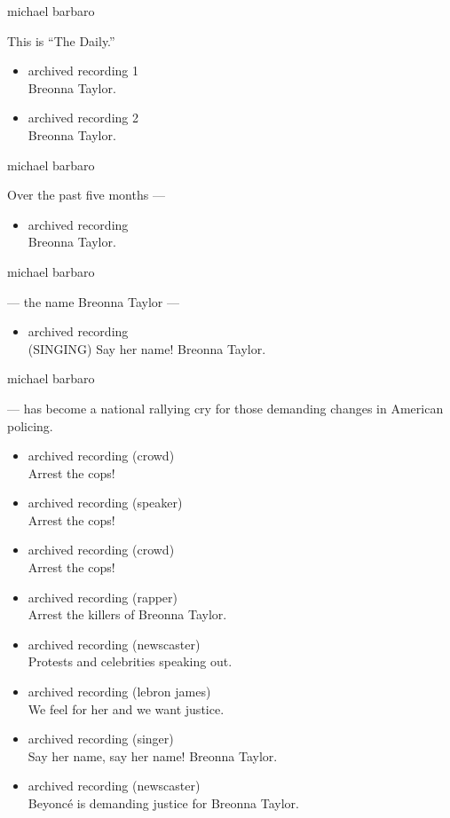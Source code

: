 michael barbaro

This is ``The Daily.''

\begin{itemize}
\item
  archived recording 1\\
  Breonna Taylor.
\item
  archived recording 2\\
  Breonna Taylor.
\end{itemize}

michael barbaro

Over the past five months ---

\begin{itemize}
\tightlist
\item
  archived recording\\
  Breonna Taylor.
\end{itemize}

michael barbaro

--- the name Breonna Taylor ---

\begin{itemize}
\tightlist
\item
  archived recording\\
  (SINGING) Say her name! Breonna Taylor.
\end{itemize}

michael barbaro

--- has become a national rallying cry for those demanding changes in
American policing.

\begin{itemize}
\item
  archived recording (crowd)\\
  Arrest the cops!
\item
  archived recording (speaker)\\
  Arrest the cops!
\item
  archived recording (crowd)\\
  Arrest the cops!
\item
  archived recording (rapper)\\
  Arrest the killers of Breonna Taylor.
\item
  archived recording (newscaster)\\
  Protests and celebrities speaking out.
\item
  archived recording (lebron james)\\
  We feel for her and we want justice.
\item
  archived recording (singer)\\
  Say her name, say her name! Breonna Taylor.
\item
  archived recording (newscaster)\\
  Beyoncé is demanding justice for Breonna Taylor.
\end{itemize}

